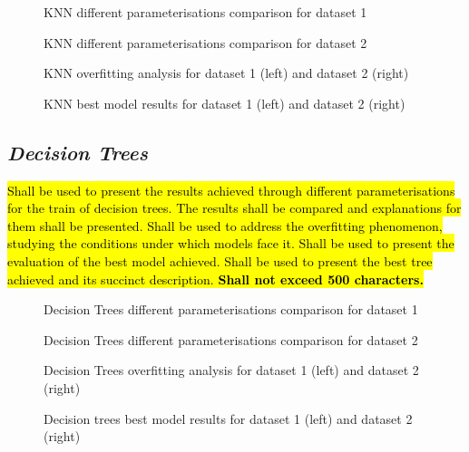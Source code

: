 \documentclass[10pt]{extarticle}
\newcommand{\ctext}[3][RGB]{%
  \begingroup
  \definecolor{hlcolor}{#1}{#2}\sethlcolor{hlcolor}%
  \hl{#3}%
  \endgroup
}
\begin{document}
\begin{figure}[H]
\caption{KNN different parameterisations comparison for dataset 1}
\end{figure}

\begin{figure}[H]
\caption{KNN different parameterisations comparison for dataset 2}
\end{figure}

\begin{figure}[H]
\caption{KNN overfitting analysis for dataset 1 (left) and dataset 2 (right)}
\end{figure}

\begin{figure}[H]
\caption{KNN best model results for dataset 1 (left) and dataset 2 (right)}
\end{figure}

\subsection*{\textit{Decision Trees}}
\ctext[RGB]{190,190,190}{Shall be used to present the results achieved through different parameterisations for the train of decision trees. The results shall be compared and explanations for them shall be presented. Shall be used to address the overfitting phenomenon, studying the conditions under which models face it. Shall be used to present the evaluation of the best model achieved. Shall be used to present the best tree achieved and its succinct description.  \textbf{Shall not exceed 500 characters.}}

\begin{figure}[H]
\caption{Decision Trees different parameterisations comparison for dataset 1}
\end{figure}

\begin{figure}[H]
\caption{Decision Trees different parameterisations comparison for dataset 2}
\end{figure}

\begin{figure}[H]
\caption{Decision Trees overfitting analysis for dataset 1 (left) and dataset 2 (right)}
\end{figure}

\begin{figure}[H]
\caption{Decision trees best model results for dataset 1 (left) and dataset 2 (right)}
\end{figure}
\end{document}
